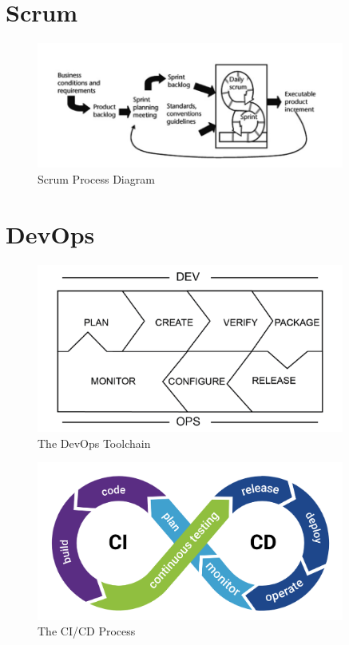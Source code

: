 \chapter{Scrum}\label{appendix:scrum}
\begin{figure}[h!]
    \centering
    \includegraphics[width=0.9\textwidth]{images/scrum.png}
    \caption{Scrum Process Diagram}
    \label{image:scrum}
\end{figure}

\chapter{DevOps}\label{appendix:devops}
\begin{figure}[h!]
    \centering
    \includegraphics[width=0.9\textwidth]{images/devops.png}
    \caption{The DevOps Toolchain}
    \label{image:devops}
\end{figure}

\begin{figure}[h!]
    \centering
    \includegraphics[width=0.9\textwidth]{images/CICD.png}
    \caption{The CI/CD Process}
    \label{image:cicd}
\end{figure}

